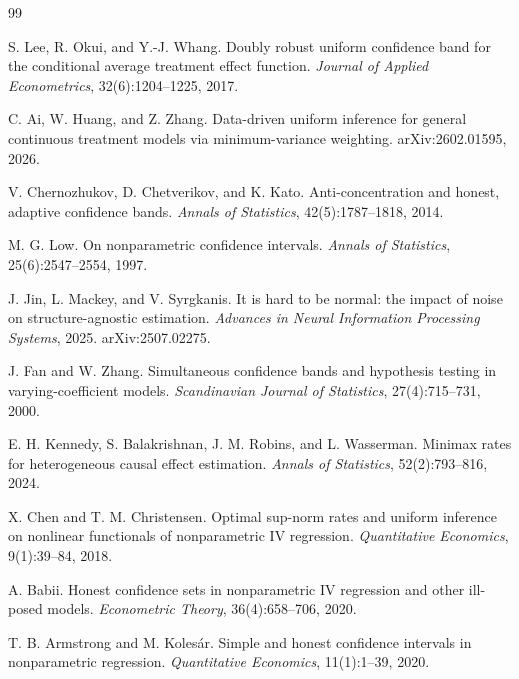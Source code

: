 \documentclass{article}
\begin{document}
\begin{thebibliography}{99}

   S. Lee, R. Okui, and Y.-J. Whang. Doubly robust uniform confidence band for the conditional average treatment effect function. \emph{Journal of Applied Econometrics}, 32(6):1204--1225, 2017.

   C. Ai, W. Huang, and Z. Zhang. Data-driven uniform inference for general continuous treatment models via minimum-variance weighting. arXiv:2602.01595, 2026.

   V. Chernozhukov, D. Chetverikov, and K. Kato. Anti-concentration and honest, adaptive confidence bands. \emph{Annals of Statistics}, 42(5):1787--1818, 2014.

   M. G. Low. On nonparametric confidence intervals. \emph{Annals of Statistics}, 25(6):2547--2554, 1997.

   J. Jin, L. Mackey, and V. Syrgkanis. It is hard to be normal: the impact of noise on structure-agnostic estimation. \emph{Advances in Neural Information Processing Systems}, 2025. arXiv:2507.02275.

   J. Fan and W. Zhang. Simultaneous confidence bands and hypothesis testing in varying-coefficient models. \emph{Scandinavian Journal of Statistics}, 27(4):715--731, 2000.

   E. H. Kennedy, S. Balakrishnan, J. M. Robins, and L. Wasserman. Minimax rates for heterogeneous causal effect estimation. \emph{Annals of Statistics}, 52(2):793--816, 2024.

   X. Chen and T. M. Christensen. Optimal sup-norm rates and uniform inference on nonlinear functionals of nonparametric IV regression. \emph{Quantitative Economics}, 9(1):39--84, 2018.

   A. Babii. Honest confidence sets in nonparametric IV regression and other ill-posed models. \emph{Econometric Theory}, 36(4):658--706, 2020.

   T. B. Armstrong and M. Kolesár. Simple and honest confidence intervals in nonparametric regression. \emph{Quantitative Economics}, 11(1):1--39, 2020.

\end{thebibliography}
\end{document}
